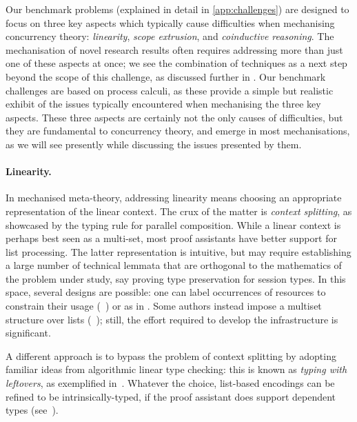 \documentclass[runningheads]{llncs}
\begin{document}
Our benchmark problems (explained in detail in \cref{app:challenges}) are designed to focus on three key aspects which typically cause difficulties when mechanising concurrency theory: \emph{linearity}, \emph{scope extrusion}, and \emph{coinductive reasoning}.
The mechanisation of novel research results often requires addressing more than just one of these aspects at once; we see the combination of techniques as a next step beyond the scope of this challenge, as discussed further in .
Our benchmark challenges are based on process calculi, as these provide a simple but realistic exhibit of the issues typically encountered when mechanising the three key aspects.
These three aspects are certainly not the only causes of difficulties, but they are fundamental to concurrency theory, and emerge in most mechanisations, as we will see presently while discussing the issues presented by them.

\paragraph{Linearity.}
In mechanised meta-theory, addressing linearity means choosing an appropriate representation of the linear context.
The crux of the matter is \emph{context splitting}, as showcased by the typing rule for parallel composition.
While a linear context is perhaps best seen as a multi-set, most proof assistants have better support for list processing.
The latter representation is intuitive, but may require establishing a large number of technical lemmata that are orthogonal to the mathematics of the problem under study, say proving type preservation for session types.
In this space, several designs are possible: one can label occurrences of resources to constrain their usage (\eg~\cite{CicconeP20}) or  as in \cite{Castro2020}.
Some authors instead impose a multiset structure over lists (\eg~\cite{ChaudhuriLR19,Danielsson12}); still, the effort required to develop the infrastructure is significant.

A different approach is to bypass the problem of context splitting by adopting familiar ideas from algorithmic linear type checking: this is known as \emph{typing with leftovers}, as exemplified in~\cite{DBLP:conf/forte/ZalakainD21}.
Whatever the choice, list-based encodings can be refined to be intrinsically-typed, if the proof assistant does support dependent types (see~\cite{Thiemann2019,CicconeP20,RouvoetPKV20}).
\end{document}
